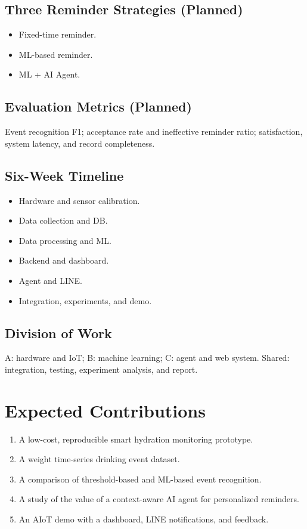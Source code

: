 \documentclass[conference]{IEEEtran}
\begin{document}
\subsection{Three Reminder Strategies (Planned)}
\begin{itemize}
\item[A] Fixed-time reminder.
\item[B] ML-based reminder.
\item[C] ML + AI Agent.
\end{itemize}

\subsection{Evaluation Metrics (Planned)}
Event recognition F1; acceptance rate and ineffective reminder ratio; satisfaction, system latency, and record completeness.

\subsection{Six-Week Timeline}
\begin{itemize}
\item[W1] Hardware and sensor calibration.
\item[W2] Data collection and DB.
\item[W3] Data processing and ML.
\item[W4] Backend and dashboard.
\item[W5] Agent and LINE.
\item[W6] Integration, experiments, and demo.
\end{itemize}

\subsection{Division of Work}
A: hardware and IoT; B: machine learning; C: agent and web system. Shared: integration, testing, experiment analysis, and report.

\section{Expected Contributions}

\begin{enumerate}
\item A low-cost, reproducible smart hydration monitoring prototype.
\item A weight time-series drinking event dataset.
\item A comparison of threshold-based and ML-based event recognition.
\item A study of the value of a context-aware AI agent for personalized reminders.
\item An AIoT demo with a dashboard, LINE notifications, and feedback.
\end{enumerate}
\end{document}
